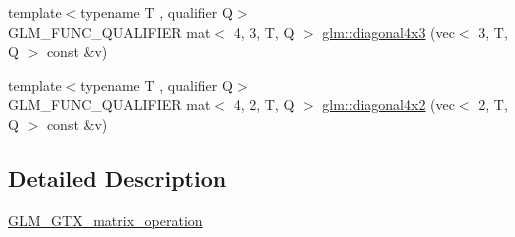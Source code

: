 \begin{DoxyCompactItemize}
\item 
{\footnotesize template$<$typename T , qualifier Q$>$ }\\G\+L\+M\+\_\+\+F\+U\+N\+C\+\_\+\+Q\+U\+A\+L\+I\+F\+I\+ER mat$<$ 4, 3, T, Q $>$ \hyperlink{group__gtx__matrix__operation_gae235def5049d6740f0028433f5e13f90}{glm\+::diagonal4x3} (vec$<$ 3, T, Q $>$ const \&v)
\item 
{\footnotesize template$<$typename T , qualifier Q$>$ }\\G\+L\+M\+\_\+\+F\+U\+N\+C\+\_\+\+Q\+U\+A\+L\+I\+F\+I\+ER mat$<$ 4, 2, T, Q $>$ \hyperlink{group__gtx__matrix__operation_gacb8969e6543ba775c6638161a37ac330}{glm\+::diagonal4x2} (vec$<$ 2, T, Q $>$ const \&v)
\end{DoxyCompactItemize}


\subsection{Detailed Description}
\hyperlink{group__gtx__matrix__operation}{G\+L\+M\+\_\+\+G\+T\+X\+\_\+matrix\+\_\+operation} 
